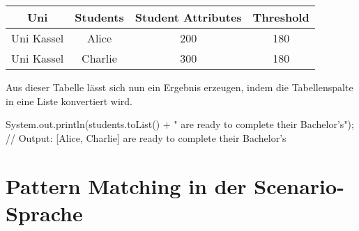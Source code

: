 \begin{tabular}{|c|c|c|c|}
    \hline
    \textbf{Uni} & \textbf{Students} & \textbf{Student Attributes} & \textbf{Threshold} \\
    \hline
    Uni Kassel & Alice   & 200 & 180 \\
    Uni Kassel & Charlie & 300 & 180 \\
    \hline
\end{tabular}

Aus dieser Tabelle lässt sich nun ein Ergebnis erzeugen, indem die Tabellenspalte  in eine Liste konvertiert wird.

\begin{jcodeblock}
    System.out.println(students.toList() + " are ready to complete their Bachelor's");
    // Output: [Alice, Charlie] are ready to complete their Bachelor's
\end{jcodeblock}


\section{Pattern Matching in der Scenario-Sprache}\label{sec:scenario-pattern-matching}

